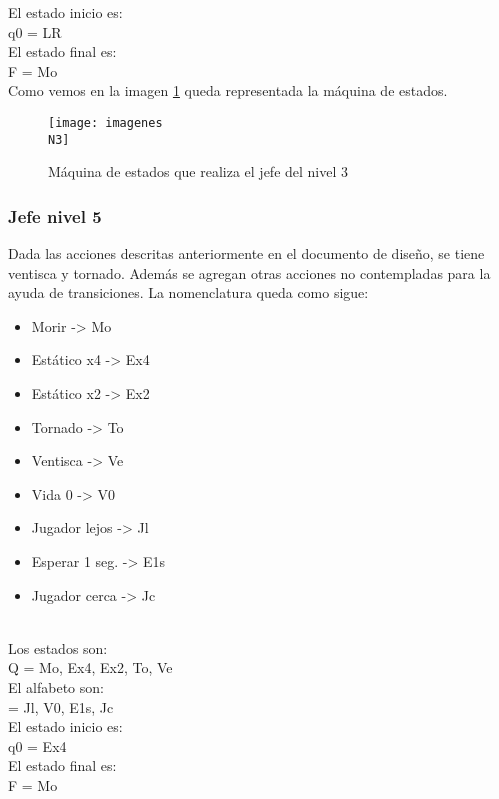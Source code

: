 El estado inicio es:
	\\[1pt]
	q0 = {LR}
		\\[1pt]
		
El estado final es:
	\\[1pt]
	F = {Mo}
		\\[1pt]

Como vemos en la imagen \ref{fig:maqN3} queda representada la máquina de estados.
\begin{figure}
	\centering
	\caption{Máquina de estados que realiza el jefe del nivel 3}
	\label{fig:maqN3}
	\texttt{[image: imagenes\\N3]}
\end{figure}

\subsubsection{Jefe nivel 5}
Dada las acciones descritas anteriormente en el documento de diseño, se tiene ventisca y tornado. Además se agregan otras acciones no contempladas para la ayuda de transiciones.
La nomenclatura queda como sigue:
\\[1pt]

\begin{itemize}
	\item Morir -> Mo
	\item Estático x4 -> Ex4
	\item Estático x2 -> Ex2
	\item Tornado -> To
	\item Ventisca -> Ve
	\item Vida 0 -> V0
	\item Jugador lejos -> Jl
	\item Esperar 1 seg. -> E1s
	\item Jugador cerca -> Jc
\end{itemize}
\\[1pt]

Los estados son:
\\[1pt]
Q = {Mo, Ex4, Ex2, To, Ve}
\\[1pt]

El alfabeto son:
\\[1pt]
\sigma = {Jl, V0, E1s, Jc}
\\[1pt]

El estado inicio es:
\\[1pt]
q0 = {Ex4}
\\[1pt]

El estado final es:
\\[1pt]
F = {Mo}
\\[1pt]

